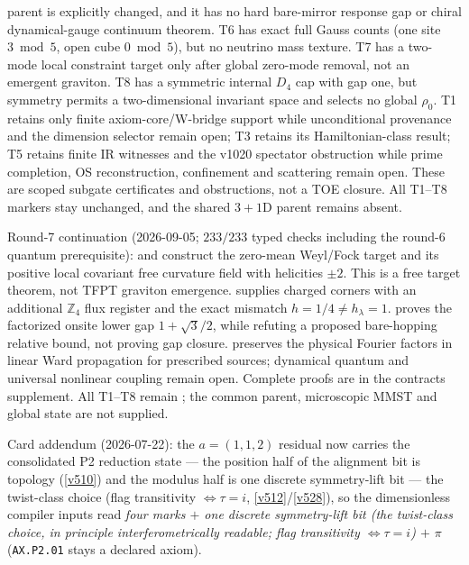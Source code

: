 \documentclass[11pt,a4paper]{article}
\newcommand{\Z}{\mathbb{Z}}
\begin{document}
parent is explicitly changed, and it has no hard bare-mirror response gap
or chiral dynamical-gauge continuum theorem. T6 has exact full Gauss counts
(one site $3\bmod5$, open cube $0\bmod5$), but no neutrino mass texture.
T7 has a two-mode local constraint target only after global zero-mode removal,
not an emergent graviton. T8 has a symmetric internal $D_4$ cap with gap one,
but symmetry permits a two-dimensional invariant space and selects no global
$\rho_0$. T1 retains only
finite axiom-core/W-bridge support while unconditional provenance and the dimension
selector remain open; T3 retains its Hamiltonian-class result; T5 retains finite IR
witnesses and the v1020 spectator obstruction while prime completion, OS reconstruction,
confinement and scattering remain open. These are scoped subgate certificates and
obstructions, not a TOE closure.  All T1--T8 markers stay unchanged, and the shared
$3{+}1$D parent remains absent.
\par\smallskip\noindent
Round-7 continuation (2026-09-05; $233/233$ typed checks including the
round-6 quantum prerequisite):
 and
 construct the zero-mean Weyl/Fock
target and its positive local covariant free curvature field with
helicities $\pm2$. This is a free target theorem, not TFPT graviton emergence.
 supplies charged corners with an
additional $\Z_4$ flux register and the exact mismatch $h=1/4\ne h_\lambda=1$.
 proves the factorized onsite lower gap
$1+\sqrt3/2$, while refuting a proposed bare-hopping relative bound, not
proving gap closure.  preserves the
physical Fourier factors in linear Ward propagation for prescribed sources;
dynamical quantum and universal nonlinear coupling remain open.
Complete proofs are in the contracts supplement. All T1--T8 remain \mO;
the common parent, microscopic MMST and global state are not supplied.
\par\smallskip
\noindent Card addendum (2026-07-22): the $a=(1,1,2)$ residual now carries the consolidated P2
reduction state --- the position half of the alignment bit is topology (\vref{v510}) and the modulus
half is one discrete symmetry-lift bit --- the twist-class choice (flag transitivity
$\iff\tau=i$, \vref{v512}/\vref{v528}), so the
dimensionless compiler inputs read \emph{four marks $+$ one discrete symmetry-lift bit (the
twist-class choice, in principle interferometrically readable; flag
transitivity $\iff\tau=i$) $+$ $\pi$}
(\texttt{AX.P2.01} stays a declared axiom).
\end{document}
